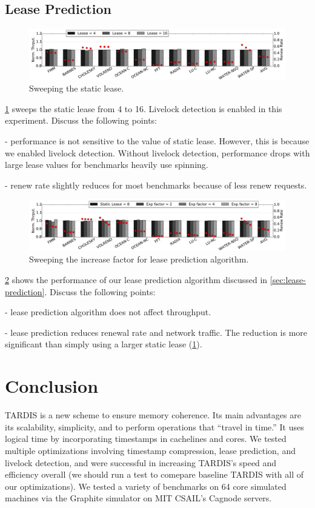 \documentclass[12pt]{article}
\begin{document}
\subsection{Lease Prediction}

\begin{figure}
	\centering
	\includegraphics[width=0.95\columnwidth]{figs/static.pdf}
	\caption{ Sweeping the static lease.  }
	\label{fig:static}
\end{figure}

\cref{fig:static} sweeps the static lease from 4 to 16. Livelock 
detection is enabled in this experiment. Discuss the following points:

- performance is not sensitive to the value of static lease. However, 
  this is because we enabled livelock detection. Without livelock 
  detection, performance drops with large lease values for benchmarks 
  heavily use spinning.

- renew rate slightly reduces for most benchmarks because of less 
  renew requests.

\begin{figure}
	\centering
	\includegraphics[width=0.95\columnwidth]{figs/exp.pdf}
	\caption{ Sweeping the increase factor for lease prediction 
	algorithm.}
	\label{fig:exp}
\end{figure}

\cref{fig:exp} shows the performance of our lease prediction algorithm 
discussed in \cref{sec:lease-prediction}. Discuss the following 
points:

- lease prediction algorithm does not affect throughput.

- lease prediction reduces renewal rate and network traffic. The 
  reduction is more significant than simply using a larger static 
  lease (\cref{fig:static}).



\section{Conclusion}
	TARDIS is a new scheme to ensure memory coherence. Its main advantages are its scalability, simplicity, and to perform operations that “travel in time.” It uses logical time by incorporating timestamps in cachelines and cores. We tested multiple optimizations involving timestamp compression, lease prediction, and livelock detection, and were successful in increasing TARDIS’s speed and efficiency overall (we should run a test to comepare baseline TARDIS with all of our optimizations). We tested a variety of benchmarks on 64 core simulated machines via the Graphite simulator on MIT CSAIL’s Cagnode servers.

{
	
	
}
\end{document}
